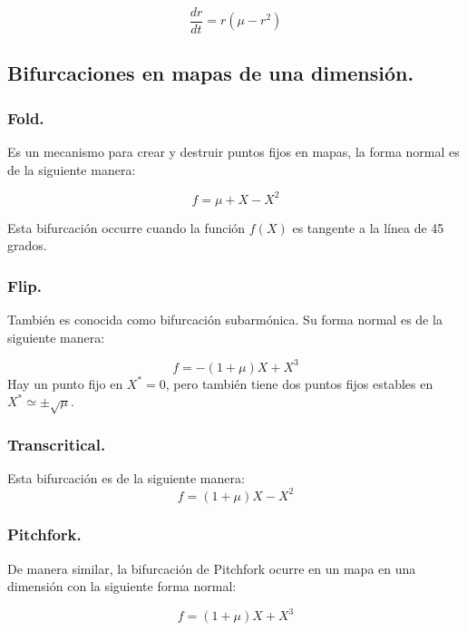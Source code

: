 \documentclass[prodmode,acmtap]{acmlarge}
\begin{document}
\begin{equation}
\frac{dr}{dt}= r(\mu - r^{2})
\end{equation}
\subsection{Bifurcaciones en mapas de una dimensión.}
\subsubsection{Fold.}
Es un mecanismo para crear y destruir puntos fijos en mapas, la forma normal es de la siguiente manera:

\begin{equation}
f= \mu +X-X^{2}
\end{equation}

Esta bifurcación occurre cuando la función $f(X)$ es tangente a la línea de 45 grados.

\subsubsection{Flip.}
También es conocida como bifurcación subarmónica.  Su forma normal es de la siguiente manera:

\begin{equation}
f = -(1+\mu)X+ X^{3}
\end{equation}
Hay un punto fijo en $X^{*}=0$, pero también tiene dos puntos fijos estables en $X^{*} \simeq \pm \sqrt{\mu}$.

\subsubsection{Transcritical.}

Esta bifurcación es de la siguiente manera:
\begin{equation}
f= (1+\mu)X-X^{2}
\end{equation}


\subsubsection{Pitchfork.}
De manera similar, la bifurcación de Pitchfork ocurre en un mapa en una dimensión con la siguiente forma normal:

\begin{equation}
f= (1+\mu)X+X^{3}
\end{equation}
\end{document}
